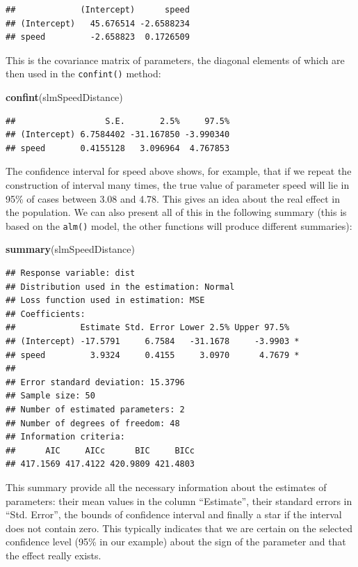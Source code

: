 \documentclass[
]{book}
\newenvironment{Shaded}{\begin{snugshade}}{\end{snugshade}}
\newcommand{\KeywordTok}[1]{\textcolor[rgb]{0.13,0.29,0.53}{\textbf{#1}}}
\newcommand{\NormalTok}[1]{#1}
\theoremstyle{definition}
\theoremstyle{definition}
\theoremstyle{definition}
\theoremstyle{definition}
\theoremstyle{remark}
\begin{document}
\begin{verbatim}
##             (Intercept)      speed
## (Intercept)   45.676514 -2.6588234
## speed         -2.658823  0.1726509
\end{verbatim}

This is the covariance matrix of parameters, the diagonal elements of which are then used in the \texttt{confint()} method:

\begin{Shaded}
\begin{Highlighting}[]
\KeywordTok{confint}\NormalTok{(slmSpeedDistance)}
\end{Highlighting}
\end{Shaded}

\begin{verbatim}
##                  S.E.       2.5%     97.5%
## (Intercept) 6.7584402 -31.167850 -3.990340
## speed       0.4155128   3.096964  4.767853
\end{verbatim}

The confidence interval for speed above shows, for example, that if we repeat the construction of interval many times, the true value of parameter speed will lie in 95\% of cases between 3.08 and 4.78. This gives an idea about the real effect in the population. We can also present all of this in the following summary (this is based on the \texttt{alm()} model, the other functions will produce different summaries):

\begin{Shaded}
\begin{Highlighting}[]
\KeywordTok{summary}\NormalTok{(slmSpeedDistance)}
\end{Highlighting}
\end{Shaded}

\begin{verbatim}
## Response variable: dist
## Distribution used in the estimation: Normal
## Loss function used in estimation: MSE
## Coefficients:
##             Estimate Std. Error Lower 2.5% Upper 97.5%  
## (Intercept) -17.5791     6.7584   -31.1678     -3.9903 *
## speed         3.9324     0.4155     3.0970      4.7679 *
## 
## Error standard deviation: 15.3796
## Sample size: 50
## Number of estimated parameters: 2
## Number of degrees of freedom: 48
## Information criteria:
##      AIC     AICc      BIC     BICc 
## 417.1569 417.4122 420.9809 421.4803
\end{verbatim}

This summary provide all the necessary information about the estimates of parameters: their mean values in the column ``Estimate'', their standard errors in ``Std. Error'', the bounds of confidence interval and finally a star if the interval does not contain zero. This typically indicates that we are certain on the selected confidence level (95\% in our example) about the sign of the parameter and that the effect really exists.
\end{document}
